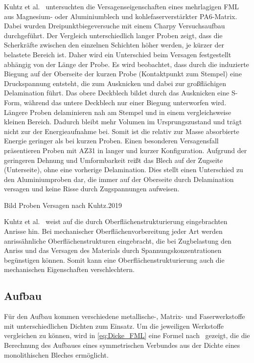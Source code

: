Kuhtz et al.~\cite{Kuhtz.2019} untersuchten die Versagenseigenschaften eines mehrlagigen FML aus Magnesium- oder Aluminiumblech und kohlefaserverstärkter PA6-Matrix.
Dabei wurden Dreipunktbiegeversuche mit einem Charpy Versuchsaufbau durchgeführt.
Der Vergleich unterschiedlich langer Proben zeigt, dass die Scherkräfte zwischen den einzelnen Schichten höher werden, je kürzer der belastete Bereich ist.
Daher wird ein Unterschied beim Versagen festgestellt abhängig von der Länge der Probe.
Es wird beobachtet, dass durch die induzierte Biegung auf der Oberseite der kurzen Probe (Kontaktpunkt zum Stempel) eine Druckspannung entsteht, die zum Ausknicken und dabei zur großflächigen Delamination führt.
Das obere Deckblech bildet durch das Ausknicken eine S-Form, während das untere Deckblech nur einer Biegung unterworfen wird.
Längere Proben delaminieren nah am Stempel und in einem vergleichsweise kleinen Bereich.
Dadurch bleibt mehr Volumen im Ursprungszustand und trägt nicht zur der Energieaufnahme bei.
Somit ist die relativ zur Masse absorbierte Energie geringer als bei kurzen Proben.
Einen besonderen Versagensfall präsentieren Proben mit AZ31 in langer und kurzer Konfiguration.
Aufgrund der geringeren Dehnung und Umformbarkeit reißt das Blech auf der Zugseite (Unterseite), ohne eine vorherige Delamination.
Dies stellt einen Unterschied zu den Aluminiumproben dar, die immer auf der Oberseite durch Delamination versagen und keine Risse durch Zugspannungen aufweisen.

Bild Proben Versagen nach Kuhtz.2019

Kuhtz et al.~\cite{Kuhtz.2019} weist auf die durch Oberflächenstrukturierung eingebrachten Anrisse hin.
Bei mechanischer Oberflächenvorbereitung jeder Art werden anrissähnliche Oberflächenstrukturen eingebracht, die bei Zugbelastung den Anriss und das Versagen des Materials durch Spannungskonzentrationen begünstigen können.
Somit kann eine Oberflächenstrukturierung auch die mechanischen Eigenschaften verschlechtern.

\subsection{Aufbau}\label{subsec:aufbau}

Für den Aufbau kommen verschiedene metallische-, Matrix- und Faserwerkstoffe mit unterschiedlichen Dichten zum Einsatz.
Um die jeweiligen Werkstoffe vergleichen zu können, wird in \autoref{eq:Dicke_FML} eine Formel nach~\cite{Wollmann.2018} gezeigt, die die Berechnung des Aufbaues eines symmetrischen Verbundes aus der Dichte eines monolithischen Bleches ermöglicht.

